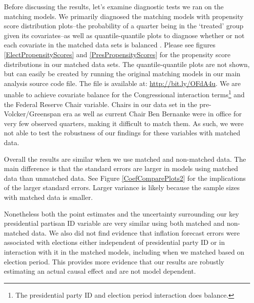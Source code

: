 \documentclass[a4paper]{article}\usepackage[]{graphicx}\usepackage[]{color}
\begin{document}
Before discussing the results, let's examine diagnostic tests we ran on the matching models. We primarily diagnosed the matching models with propensity score distribution plots--the probability of a quarter being in the `treated' group given its covariates--as well as quantile-quantile plots to diagnose whether or not each covariate in the matched data sets is balanced \citep{Ho2007}. Please see figures \ref{ElectPropensityScores} and \ref{PresPropensityScores} for the propensity score distributions in our matched data sets. The quantile-quantile plots are not shown, but can easily be created by running the original matching models in our main analysis source code file. The file is available at: \url{http://bit.ly/OFdA4u}. We are unable to achieve covariate balance for the Congressional interaction terms\footnote{The presidential party ID and election period interaction does balance.} and the Federal Reserve Chair variable. Chairs in our data set in the pre-Volcker/Greenspan era as well as current Chair Ben Bernanke were in office for very few observed quarters, making it difficult to match them. As such, we were not able to test the robustness of our findings for these variables with matched data.

Overall the results are similar when we use matched and non-matched data. The main difference is that the standard errors are larger in models using matched data than unmatched data. See Figure \ref{CoefComparePlots2} for the implications of the larger standard errors. Larger variance is likely because the sample sizes with matched data is smaller. 

Nonetheless both the point estimates and the uncertainty surrounding our key presidential partisan ID variable are very similar using both matched and non-matched data. We also did not find evidence that inflation forecast errors were associated with elections either independent of presidential party ID or in interaction with it in the matched models, including when we matched based on election period. This provides more evidence that our results are robustly estimating an actual causal effect and are not model dependent. 

\end{document}
